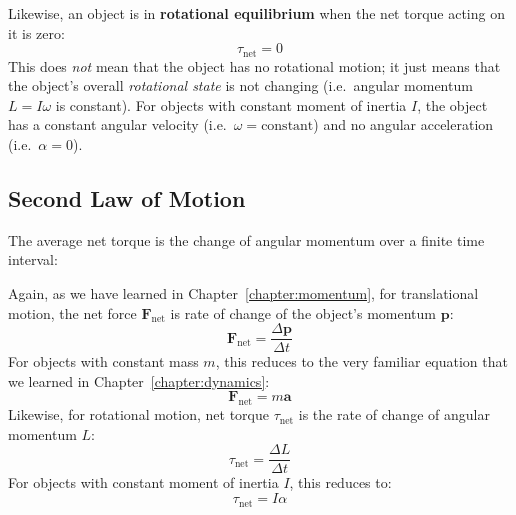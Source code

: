 Likewise, an object is in \textbf{rotational equilibrium} when the net torque
acting on it is zero:
\begin{equation}
  \boxed{
    \tau_\text{net}=0
  }
\end{equation}
This does \emph{not} mean that the object has no rotational motion; it just
means that the object's overall \emph{rotational state} is not changing (i.e.\
angular momentum $L=I\omega$ is constant). For objects with constant moment of
inertia $I$, the object has a constant angular velocity (i.e.\
$\omega=\text{constant}$) and no angular acceleration (i.e.\ $\alpha=0$).




\subsection{Second Law of Motion}
The average net torque is the change of angular momentum over a finite time
interval:


Again, as we have learned in Chapter~\ref{chapter:momentum}, for translational
motion, the net force $\bm F_\text{net}$ is rate of change of the object's
momentum $\bm p$:
\begin{equation*}
  \bm F_\text{net}=\frac{\Delta\bm p}{\Delta t}
\end{equation*}
For objects with constant mass $m$, this reduces to the very familiar
equation that we learned in Chapter~\ref{chapter:dynamics}:
\begin{equation*}
  \bm F_\text{net}=m\bm a
\end{equation*}
Likewise, for rotational motion, net torque $\tau_\text{net}$ is the rate of
change of angular momentum $L$:
\begin{equation}
  \boxed{
    \tau_\text{net}=\frac{\Delta L}{\Delta t}
  }
\end{equation}
For objects with constant moment of inertia $I$, this reduces to:
\begin{equation}
  \boxed{
    \tau_\text{net}=I\alpha
  }
\end{equation}



